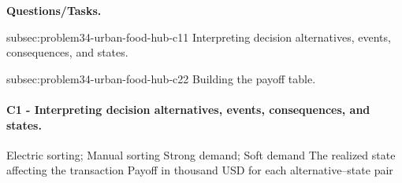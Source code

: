 	\textbf{Questions/Tasks.}
	\begin{enumerate}
	\CriterionTask
	{subsec:problem34-urban-food-hub-c1}{1}
	{Interpreting decision alternatives, events, consequences, and states.}

	\CriterionTask
	{subsec:problem34-urban-food-hub-c2}{2}
	{Building the payoff table.}
	\end{enumerate}

\paragraph*{C1 - Interpreting decision alternatives, events, consequences, and states.}
	\label{subsec:problem34-urban-food-hub-c1}
	\DecisionElementsTable
	{Electric sorting; Manual sorting}
	{Strong demand; Soft demand}
	{The realized state affecting the transaction}
	{Payoff in thousand USD for each alternative--state pair}

